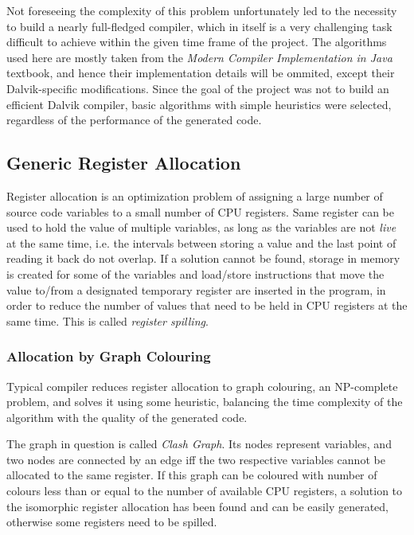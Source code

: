 \documentclass[12pt,twoside,notitlepage]{report}
\begin{document}
Not foreseeing the complexity of this problem unfortunately led to the necessity to build a nearly full-fledged compiler, which in itself is a very challenging task difficult to achieve within the given time frame of the project.  The algorithms used here are mostly taken from the \emph{Modern Compiler Implementation in Java} textbook, and hence their implementation details will be ommited, except their Dalvik-specific modifications. Since the goal of the project was not to build an efficient Dalvik compiler, basic algorithms with simple heuristics were selected, regardless of the performance of the generated code. 

\subsection{Generic Register Allocation}

Register allocation is an optimization problem of assigning a large number of source code variables to a small number of CPU registers. Same register can be used to hold the value of multiple variables, as long as the variables are not \emph{live} at the same time, i.e. the intervals between storing a value and the last point of reading it back do not overlap. If a solution cannot be found, storage in memory is created for some of the variables and load/store instructions that move the value to/from a designated temporary register are inserted in the program, in order to reduce the number of values that need to be held in CPU registers at the same time. This is called \emph{register spilling}.

\subsubsection{Allocation by Graph Colouring}

Typical compiler reduces register allocation to graph colouring, an NP-complete problem, and solves it using some heuristic, balancing the time complexity of the algorithm with the quality of the generated code. 

The graph in question is called \emph{Clash Graph}. Its nodes represent variables, and two nodes are connected by an edge iff the two respective variables cannot be allocated to the same register. If this graph can be coloured with number of colours less than or equal to the number of available CPU registers, a solution to the isomorphic register allocation has been found and can be easily generated, otherwise some registers need to be spilled. 
\end{document}
